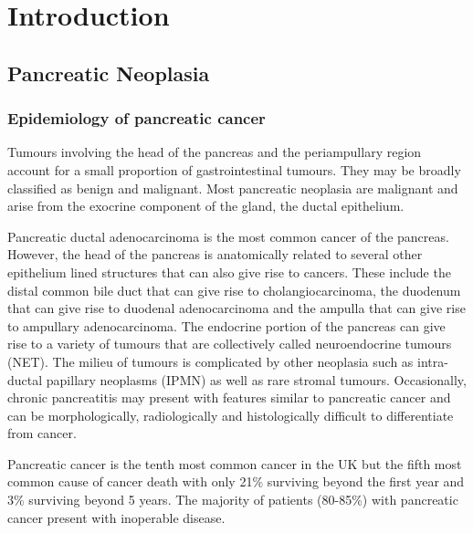 
\chapter{Introduction}
\label{ch_intro}


\clearpage

\section{Pancreatic Neoplasia}

\subsection{Epidemiology of pancreatic cancer}
Tumours involving the head of the pancreas and the periampullary region account for a small proportion of gastrointestinal tumours. They may be broadly classified as benign and malignant. Most pancreatic neoplasia are malignant and arise from the exocrine component of the gland, the ductal epithelium. 

Pancreatic ductal adenocarcinoma is the most common cancer of the pancreas. However, the head of the pancreas is anatomically related to several other epithelium lined structures that can also give rise to cancers. These include the distal common bile duct that can give rise to cholangiocarcinoma, the duodenum that can give rise to duodenal adenocarcinoma and the ampulla that can give rise to ampullary adenocarcinoma. The endocrine portion of the pancreas can give rise to a variety of tumours that are collectively called neuroendocrine tumours (NET). The milieu of tumours is complicated by other neoplasia such as intra-ductal papillary neoplasms (IPMN) as well as rare stromal tumours. Occasionally, chronic pancreatitis may present with features similar to pancreatic cancer and can be morphologically, radiologically and histologically difficult to differentiate from cancer.

Pancreatic cancer is the tenth most common cancer in the UK but the fifth most common cause of cancer death with only 21\% surviving beyond the first year and 3\% surviving beyond 5 years.\parencite{cancerresearchuk_cancer_2014} The majority of patients (80-85\%) with pancreatic cancer present with inoperable disease.\parencite{cancerresearchuk_cancer_2014,sener_pancreatic_1999}

